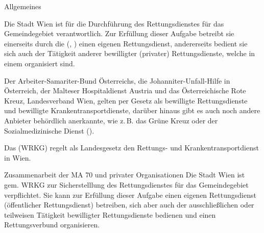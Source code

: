 \Text
{Allgemeines}%
{%
Die Stadt Wien ist für die Durchführung des Rettungsdienstes
für das Gemeindegebiet verantwortlich. Zur Erfüllung dieser
Aufgabe betreibt sie einerseits durch die
 (, ) einen eigenen Rettungsdienst, andererseits
bedient sie sich auch der Tätigkeit anderer bewilligter
(privater) Rettungsdienste, welche in einem
 organisiert sind.


Der Arbeiter-Samariter-Bund Österreichs, die
Johanniter-Unfall-Hilfe in Österreich, der Malteser
Hospitaldienst Austria und das Österreichische Rote Kreuz,
Landesverband Wien, gelten per Gesetz als bewilligte
Rettungsdienste und bewilligte Krankentransportdienste,
darüber hinaus gibt es auch noch andere Anbieter
behördlich anerkannte, wie z.\,B. das Grüne Kreuz oder der
Sozialmedizinische Dienst ().


Das  (WRKG)
regelt als Landesgesetz den Rettungs- und
Krankentransportdienst in Wien.
}%




\Text
{Zusammenarbeit der MA 70 und privater Organisationen}%
{%
Die Stadt Wien ist gem. WRKG zur Sicherstelllung des
Rettungsdienstes für das Gemeindegebiet verpflichtet. Sie
kann zur Erfüllung dieser Aufgabe einen eigenen
Rettungsdienst (öffentlicher Rettungsdienst) betreiben, sich
aber auch der ausschließlichen oder teilweisen Tätigkeit
bewilligter Rettungsdienste bedienen und einen
Rettungsverbund organisieren. 
}%


